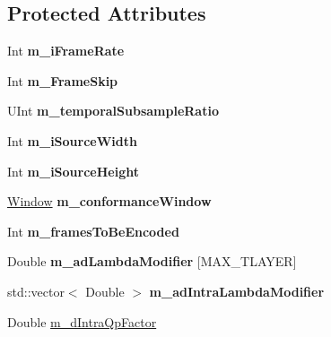\subsection*{Protected Attributes}
\begin{DoxyCompactItemize}
\item 
\mbox{\label{class_t_enc_cfg_abf5129e8537609e0fdcbca48ff2acd27}} 
Int {\bfseries m\+\_\+i\+Frame\+Rate}
\item 
\mbox{\label{class_t_enc_cfg_a3cba3b650f8a21b6b9f6b9a039e2a7fa}} 
Int {\bfseries m\+\_\+\+Frame\+Skip}
\item 
\mbox{\label{class_t_enc_cfg_ab83077f355225921fd46f1877ec4c8ba}} 
U\+Int {\bfseries m\+\_\+temporal\+Subsample\+Ratio}
\item 
\mbox{\label{class_t_enc_cfg_a1b922aad8bc7e062d99646d7ef4c3139}} 
Int {\bfseries m\+\_\+i\+Source\+Width}
\item 
\mbox{\label{class_t_enc_cfg_a687b63f3741a48205f09445b2a0fee4b}} 
Int {\bfseries m\+\_\+i\+Source\+Height}
\item 
\mbox{\label{class_t_enc_cfg_a63f1ce4ec6159de2230b481fb6e1f6bd}} 
\hyperlink{class_window}{Window} {\bfseries m\+\_\+conformance\+Window}
\item 
\mbox{\label{class_t_enc_cfg_aac11042082d17759edc3ee8f2a7a74fb}} 
Int {\bfseries m\+\_\+frames\+To\+Be\+Encoded}
\item 
\mbox{\label{class_t_enc_cfg_a49944fc9ee662362e20cafe411362bac}} 
Double {\bfseries m\+\_\+ad\+Lambda\+Modifier} \mbox{[}M\+A\+X\+\_\+\+T\+L\+A\+Y\+ER\mbox{]}
\item 
\mbox{\label{class_t_enc_cfg_a663ffd0fa4c362fd64c65a7b8a499da4}} 
std\+::vector$<$ Double $>$ {\bfseries m\+\_\+ad\+Intra\+Lambda\+Modifier}
\item 
\mbox{\label{class_t_enc_cfg_a11d212560759694c82752e1e393fd0dc}} 
Double \hyperlink{class_t_enc_cfg_a11d212560759694c82752e1e393fd0dc}{m\+\_\+d\+Intra\+Qp\+Factor}

\end{DoxyCompactItemize}
